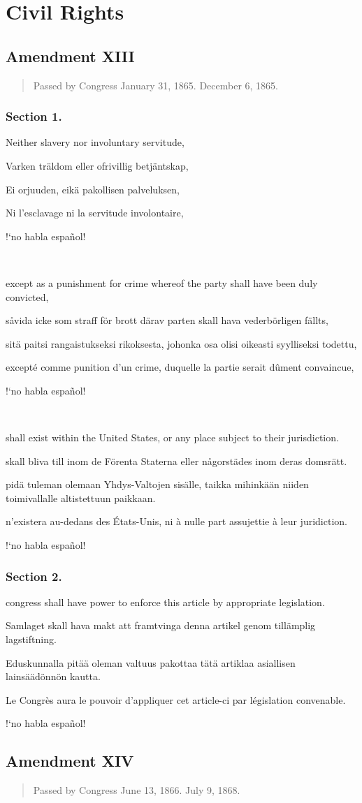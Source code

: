 \documentclass[a4paper,landscape,10pt]{article}
\newcommand{\tblock}[5]{\noindent\begin{minipage}[t]{0.18\textwidth}\foreignlanguage{english}{#1}\end{minipage}\hskip 0.025\textwidth\begin{minipage}[t]{0.18\textwidth}\foreignlanguage{swedish}{#2}\end{minipage}\hskip 0.025\textwidth\begin{minipage}[t]{0.18\textwidth}\foreignlanguage{finnish}{#3}\end{minipage}\hskip 0.025\textwidth\begin{minipage}[t]{0.18\textwidth}\foreignlanguage{french}{#4}\end{minipage}\hskip 0.025\textwidth\begin{minipage}[t]{0.18\textwidth}\foreignlanguage{spanish}{#5}\end{minipage}}
\begin{document}
\section*{Civil Rights}
\subsection*{Amendment XIII}
\begin{quote}\small
	Passed by Congress January 31, 1865.  December 6, 1865.
\end{quote}
\subsubsection*{Section 1.}
\tblock
{Neither slavery nor involuntary servitude,}
{Varken träldom eller ofrivillig betjäntskap,}
{Ei orjuuden, eikä pakollisen palveluksen,}
{Ni l'esclavage ni la servitude involontaire,}
{!`no habla español!}

~

\tblock
{except as a punishment for crime whereof the party shall have been duly convicted,}
{såvida icke som straff för brott därav parten skall hava vederbörligen fällts,}
{sitä paitsi rangaistukseksi rikoksesta, johonka osa olisi oikeasti syylliseksi todettu,}
{excepté comme punition d'un crime, duquelle la partie serait dûment convaincue,}
{!`no habla español!}

~

\tblock
{shall \gls{exist} within the United States, or any place subject to their jurisdiction.}
{skall bliva till inom de Förenta Staterna eller någorstädes inom deras domsrätt.}
{pidä tuleman olemaan Yhdys-Valtojen sisälle, taikka mihinkään niiden toimivallalle altistettuun paikkaan.}
{n'existera au-dedans des États-Unis, ni à nulle part assujettie à leur juridiction.}
{!`no habla español!}


\subsubsection*{Section 2.}
\tblock
{\Gls{congress} shall have power to enforce this article by appropriate legislation.}
{Samlaget skall hava makt att framtvinga denna artikel genom tillämplig lagstiftning.}
{Eduskunnalla pitää oleman valtuus pakottaa tätä artiklaa asiallisen lainsäädönnön kautta.}
{Le Congrès aura le pouvoir d'appliquer cet article-ci par législation convenable.}
{!`no habla español!}



\subsection*{Amendment XIV}
\begin{quote}\small
	Passed by Congress June 13, 1866.  July 9, 1868.
\end{quote}
\end{document}
